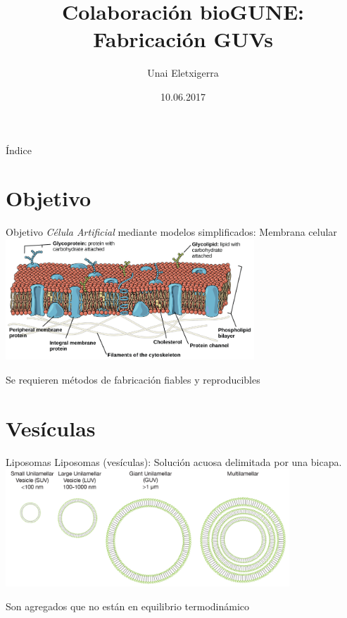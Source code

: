 \documentclass[spanish]{beamer}
\title[bioGUNE || Fabricación GUVs]{Colaboración bioGUNE:\\ Fabricación GUVs}
\author{Unai Eletxigerra}
\institute{IK4-Tekniker}
\date{10.06.2017}
\begin{document}
\begin{frame}
  \titlepage
\end{frame}

\begin{frame}{Índice}
 \tableofcontents
\end{frame}

\section{Objetivo}

\begin{frame}{Objetivo}
 \emph{Célula Artificial} mediante modelos simplificados: Membrana celular\\
  \vfill
  \centering
  \includegraphics[width=0.7\textwidth]{img/membrane}
  \vfill
  \raggedright
  Se requieren métodos de fabricación fiables y reproducibles
\end{frame}

\section{Vesículas}

\begin{frame}{Liposomas}
  Liposomas (vesículas): Solución acuosa delimitada por una bicapa.
  \vfill
  \centering
  \includegraphics[width=0.8\textwidth]{img/guv}
  \vfill
  \raggedright
  Son agregados que no están en equilibrio termodinámico
\end{frame}
\end{document}
